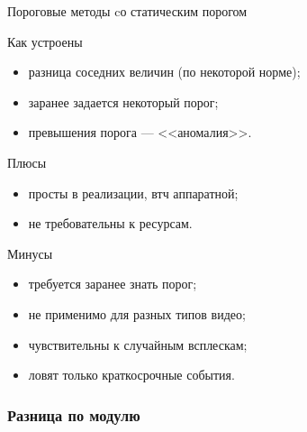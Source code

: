 

\begin{frame}{Пороговые методы cо статическим порогом}
    \begin{gray-box}{Как устроены}
        \begin{itemize}
            \item разница соседних величин (по некоторой норме);
            \item заранее задается некоторый порог;
            \item превышения порога — <<аномалия>>.
        \end{itemize}
    \end{gray-box}
    \vspace{0.5em}
    \begin{orange-box}{Плюсы}
        \begin{itemize}
            \item просты в реализации, втч аппаратной;
            \item не требовательны к ресурсам.
        \end{itemize}%
    \end{orange-box}
    \vspace{0.5em}
    \begin{blue-box}{Минусы}
        \begin{itemize}
            \item требуется заранее знать порог;
            \item не применимо для разных типов видео;
            \item чувствительны к случайным всплескам;
            \item ловят только краткосрочные события.
        \end{itemize}%
    \end{blue-box}
\end{frame}

\subsubsection*{Разница по модулю}

